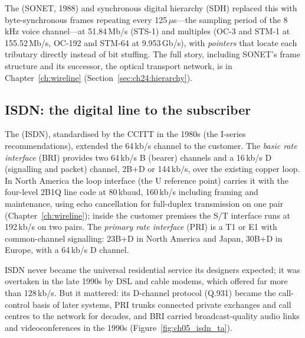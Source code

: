 The  (SONET, 1988) and synchronous digital hierarchy (SDH)
replaced this with byte-synchronous frames repeating every 125\,$\mu$s---the sampling period of
the 8\,kHz voice channel---at 51.84\,Mb/s (STS-1) and multiples (OC-3 and STM-1 at 155.52\,Mb/s,
OC-192 and STM-64 at 9.953\,Gb/s), with \emph{pointers} that locate each tributary directly
instead of bit stuffing. The full story, including SONET's frame structure and its successor, the
optical transport network, is in Chapter~\ref{ch:wireline} (Section~\ref{sec:ch24:hierarchy}).


\subsection{ISDN: the digital line to the subscriber}

The  (ISDN), standardised by the CCITT in the 1980s
(the I-series recommendations), extended the 64\,kb/s channel to the customer. The \emph{basic
rate interface} (BRI) provides two 64\,kb/s B (bearer) channels and a 16\,kb/s D (signalling and
packet) channel, 2B+D or 144\,kb/s, over the existing copper loop. In North America the loop
interface (the U reference point) carries it with the four-level 2B1Q line code at 80\,kbaud,
160\,kb/s including framing and maintenance, using echo cancellation for full-duplex
transmission on one pair (Chapter~\ref{ch:wireline}); inside the customer premises the S/T
interface runs at 192\,kb/s on two pairs. The \emph{primary rate interface} (PRI) is a T1 or E1
with common-channel signalling: 23B+D in North America and Japan, 30B+D in Europe, with a
64\,kb/s D channel.

ISDN never became the universal residential service its designers expected; it was overtaken in
the late 1990s by DSL and cable modems, which offered far more than 128\,kb/s. But it mattered:
its D-channel protocol (Q.931) became the call-control basis of later systems, PRI trunks
connected private exchanges and call centres to the network for decades, and BRI carried
broadcast-quality audio links and videoconferences in the 1990s (Figure~\ref{fig:ch05_isdn_ta}).

